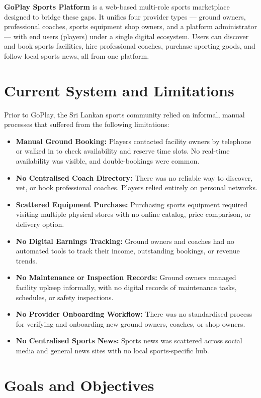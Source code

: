 \documentclass[12pt,a4paper]{report}
\begin{document}
\textbf{GoPlay Sports Platform} is a web-based multi-role sports marketplace designed to bridge these gaps. It unifies four provider types — ground owners, professional coaches, sports equipment shop owners, and a platform administrator — with end users (players) under a single digital ecosystem. Users can discover and book sports facilities, hire professional coaches, purchase sporting goods, and follow local sports news, all from one platform.

\section{Current System and Limitations}

Prior to GoPlay, the Sri Lankan sports community relied on informal, manual processes that suffered from the following limitations:

\begin{itemize}[leftmargin=1.5cm]
  \item \textbf{Manual Ground Booking:} Players contacted facility owners by telephone or walked in to check availability and reserve time slots. No real-time availability was visible, and double-bookings were common.
  \item \textbf{No Centralised Coach Directory:} There was no reliable way to discover, vet, or book professional coaches. Players relied entirely on personal networks.
  \item \textbf{Scattered Equipment Purchase:} Purchasing sports equipment required visiting multiple physical stores with no online catalog, price comparison, or delivery option.
  \item \textbf{No Digital Earnings Tracking:} Ground owners and coaches had no automated tools to track their income, outstanding bookings, or revenue trends.
  \item \textbf{No Maintenance or Inspection Records:} Ground owners managed facility upkeep informally, with no digital records of maintenance tasks, schedules, or safety inspections.
  \item \textbf{No Provider Onboarding Workflow:} There was no standardised process for verifying and onboarding new ground owners, coaches, or shop owners.
  \item \textbf{No Centralised Sports News:} Sports news was scattered across social media and general news sites with no local sports-specific hub.
\end{itemize}

\section{Goals and Objectives}
\end{document}

